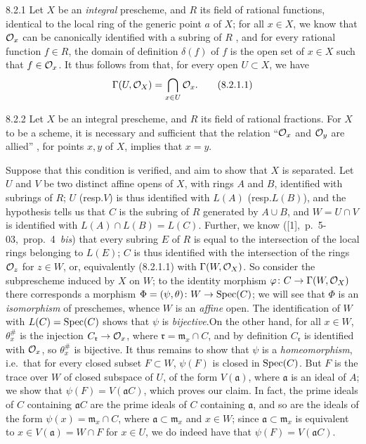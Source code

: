 
\begin{env}{8.2.1}
\label{env-1.8.2.1}
Let $X$ be an \emph{integral} prescheme, and $R$ its field of
rational functions, identical to the local ring of the generic point $a$ of $X$;
for all $x\in X$, we know that $\mathcal{O}_x$ can be canonically identified with a
subring of $R$ , and for every rational function $f\in R$, the
domain of definition $\delta(f)$ of $f$ is the open set of $x\in X$ such that
$f\in\mathcal{O}_x$. It thus follows from  that, for every open $U\subset X$,
we have
\[
  \Gamma(U,\mathcal{O}_X)=\bigcap_{x\in U}\mathcal{O}_x.\tag{8.2.1.1}
\]
\end{env}

\begin{env}[Proposition]{8.2.2}
\label{prop-1.8.2.2}
Let $X$ be an integral prescheme,
and $R$ its field of rational fractions. For $X$ to be a scheme, it is
necessary and sufficient that the relation ``$\mathcal{O}_x$ and $\mathcal{O}_y$ are allied''
, for points $x,y$ of $X$, implies that $x=y$.
\end{env}

Suppose that this condition is verified, and aim to show that $X$ is separated.
Let $U$ and $V$ be two distinct affine opens of $X$, with rings $A$ and $B$,
identified with subrings of $R$; $U$ (resp.$V$) is thus identified 
with $L(A)$ (resp.$L(B)$), and the hypothesis tells us  that $C$ is
the subring of $R$ generated by $A\cup B$, and $W=U\cap V$ is identified with
$L(A)\cap L(B)=L(C)$. Further, we know
([1],~p.~{5-03},~prop.~4~\emph{bis}) that every subring $E$ of $R$ is
equal to the intersection of the local rings belonging to $L(E)$; $C$ is thus
identified with the intersection of the rings $\mathcal{O}_z$ for $z\in W$, or,
equivalently (8.2.1.1) with $\Gamma(W,\mathcal{O}_X)$. So consider the subprescheme
induced by $X$ on $W$; to the {identity} morphism $\varphi\colon
C\to\Gamma(W,\mathcal{O}_X)$ there corresponds  a morphism
$\Phi=(\psi,\theta)\colon W\to\operatorname{Spec}(C)$; we will see that $\Phi$ is an
\emph{isomorphism} of preschemes, whence $W$ is an \emph{affine} open. The
identification of $W$ with $L(C)=\operatorname{Spec}(C)$ shows that $\psi$ is
\emph{bijective}.On the other hand, for all $x\in W$, $\theta_x^\#$ is the
injection $C_\mathfrak{r}\to\mathcal{O}_x$, where $\mathfrak{r}=\mathfrak{m}_x\cap C$,
and by definition $C_\mathfrak{r}$ is identified with $\mathcal{O}_x$, so $\theta_x^\#$
is bijective. It thus remains to show that $\psi$ is a \emph{homeomorphism},
i.e.\ that for every closed subset $F\subset W$, $\psi(F)$ is closed in
$\operatorname{Spec}(C)$. But $F$ is the {trace over} $W$ of closed subspace of $U$,
of the form $V(\mathfrak{a})$, where $\mathfrak{a}$ is an ideal of $A$; we show
that $\psi(F)=V(\mathfrak{a}C)$, which proves our claim. In fact, the prime
ideals of $C$ containing $\mathfrak{a}C$ are the prime ideals of $C$ containing
$\mathfrak{a}$, and so are the ideals of the form $\psi(x)=\mathfrak{m}_x\cap
C$, where $\mathfrak{a}\subset\mathfrak{m}_x$ and $x\in W$; since
$\mathfrak{a}\subset\mathfrak{m}_x$ is equivalent to $x\in V(\mathfrak{a})=W\cap
F$ for $x\in U$, we do indeed have that $\psi(F)=V(\mathfrak{a}C)$.

